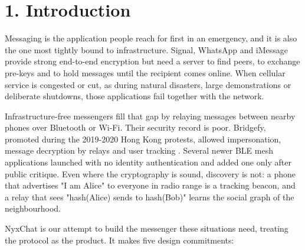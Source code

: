 \documentclass[conference]{IEEEtran}
\begin{document}
\section{1. Introduction}
Messaging is the application people reach for first in an emergency, and it is also the one most tightly bound to infrastructure. Signal, WhatsApp and iMessage provide strong end-to-end encryption \cite{ref2,ref13,ref18} but need a server to find peers, to exchange pre-keys and to hold messages until the recipient comes online. When cellular service is congested or cut, as during natural disasters, large demonstrations or deliberate shutdowns, those applications fail together with the network.

Infrastructure-free messengers fill that gap by relaying messages between nearby phones over Bluetooth or Wi-Fi. Their security record is poor. Bridgefy, promoted during the 2019-2020 Hong Kong protests, allowed impersonation, message decryption by relays and user tracking \cite{ref6,ref7}. Several newer BLE mesh applications launched with no identity authentication and added one only after public critique. Even where the cryptography is sound, discovery is not: a phone that advertises "I am Alice" to everyone in radio range is a tracking beacon, and a relay that sees "hash(Alice) sends to hash(Bob)" learns the social graph of the neighbourhood.

NyxChat is our attempt to build the messenger these situations need, treating the protocol as the product. It makes five design commitments:
\end{document}
